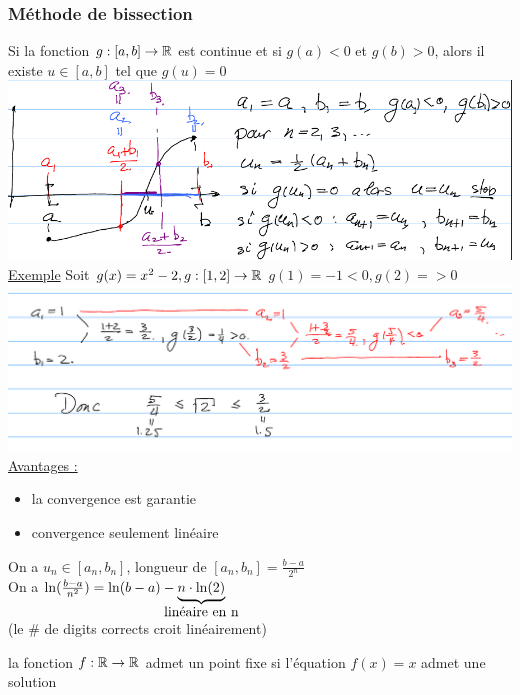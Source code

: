 \documentclass[12pt,a4paper]{article}
\newcommand{\Exemple}{\underline{Exemple} }
\begin{document}
{\subsubsection*{Méthode de bissection}
Si la fonction $g: [a,b] \to \mathbb{R}$ est continue et si $g(a) < 0$ et $g(b) > 0$, alors il existe $u \in [a,b]$ tel que $g(u) = 0$\\
\includegraphics[scale=0.5]{illustrations_Analyse/metho_bissec}\\
\Exemple Soit $g(x) = x^2 -2, g:[1,2] \to \mathbb{R}$ $ g(1) = -1 < 0, g(2) =  > 0$\\
\includegraphics[scale=0.5]{illustrations_Analyse/exemple_bissec}\\
\underline{Avantages :} 
\begin{itemize}
\item la convergence est garantie
\item convergence seulement linéaire
\end{itemize}
On a $u_n \in [a_n, b_n]$, longueur de $[a_n,b_n] = \frac{b-a}{2^n}$\\
On a $\ln(\frac{b-a}{n^2}) = \ln(b-a) - \underbrace{n\cdot \ln(2)}_{\mathclap{\mbox{linéaire en n}}}$\\
(le \# de digits corrects croit linéairement)
\begin{boite}
\Definition la fonction $f: \mathbb{R} \to \mathbb{R}$ admet un point fixe si l'équation $f(x) = x$ admet une solution
\end{boite}

}
\end{document}
